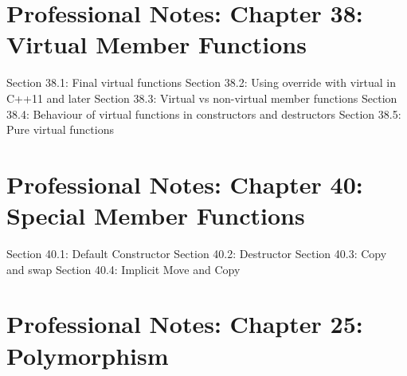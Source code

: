 \hypertarget{professional-notes-chapter-38-virtual-member-functions}{%
\section{Professional Notes: Chapter 38: Virtual Member
Functions}\label{professional-notes-chapter-38-virtual-member-functions}}

Section 38.1: Final virtual functions Section 38.2: Using override with
virtual in C++11 and later Section 38.3: Virtual vs non-virtual member
functions Section 38.4: Behaviour of virtual functions in constructors
and destructors Section 38.5: Pure virtual functions

\hypertarget{professional-notes-chapter-40-special-member-functions}{%
\section{Professional Notes: Chapter 40: Special Member
Functions}\label{professional-notes-chapter-40-special-member-functions}}

Section 40.1: Default Constructor Section 40.2: Destructor Section 40.3:
Copy and swap Section 40.4: Implicit Move and Copy

\hypertarget{professional-notes-chapter-25-polymorphism-1}{%
\section{Professional Notes: Chapter 25:
Polymorphism}\label{professional-notes-chapter-25-polymorphism-1}}

